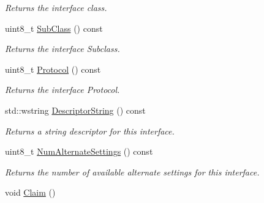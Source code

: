 \begin{DoxyCompactItemize}
\begin{DoxyCompactList}\small\item\em Returns the interface class. \end{DoxyCompactList}\item 
\hypertarget{class_lib_u_s_b_1_1_interface_impl_ab273906ca4e28180ea355291a75f7ee3}{uint8\-\_\-t \hyperlink{class_lib_u_s_b_1_1_interface_impl_ab273906ca4e28180ea355291a75f7ee3}{Sub\-Class} () const }\label{class_lib_u_s_b_1_1_interface_impl_ab273906ca4e28180ea355291a75f7ee3}

\begin{DoxyCompactList}\small\item\em Returns the interface Subclass. \end{DoxyCompactList}\item 
\hypertarget{class_lib_u_s_b_1_1_interface_impl_a154bcb2b59473c74b662684db819191f}{uint8\-\_\-t \hyperlink{class_lib_u_s_b_1_1_interface_impl_a154bcb2b59473c74b662684db819191f}{Protocol} () const }\label{class_lib_u_s_b_1_1_interface_impl_a154bcb2b59473c74b662684db819191f}

\begin{DoxyCompactList}\small\item\em Returns the interface Protocol. \end{DoxyCompactList}\item 
\hypertarget{class_lib_u_s_b_1_1_interface_impl_a561038e788c9292f252e4383398cd1a2}{std\-::wstring \hyperlink{class_lib_u_s_b_1_1_interface_impl_a561038e788c9292f252e4383398cd1a2}{Descriptor\-String} () const }\label{class_lib_u_s_b_1_1_interface_impl_a561038e788c9292f252e4383398cd1a2}

\begin{DoxyCompactList}\small\item\em Returns a string descriptor for this interface. \end{DoxyCompactList}\item 
\hypertarget{class_lib_u_s_b_1_1_interface_impl_a02737338ff031a77327fc54e4375e59a}{uint8\-\_\-t \hyperlink{class_lib_u_s_b_1_1_interface_impl_a02737338ff031a77327fc54e4375e59a}{Num\-Alternate\-Settings} () const }\label{class_lib_u_s_b_1_1_interface_impl_a02737338ff031a77327fc54e4375e59a}

\begin{DoxyCompactList}\small\item\em Returns the number of available alternate settings for this interface. \end{DoxyCompactList}\item 
\hypertarget{class_lib_u_s_b_1_1_interface_impl_a7bc22950574a6e53becd3305cc06d796}{void \hyperlink{class_lib_u_s_b_1_1_interface_impl_a7bc22950574a6e53becd3305cc06d796}{Claim} ()}\label{class_lib_u_s_b_1_1_interface_impl_a7bc22950574a6e53becd3305cc06d796}


\end{DoxyCompactItemize}
